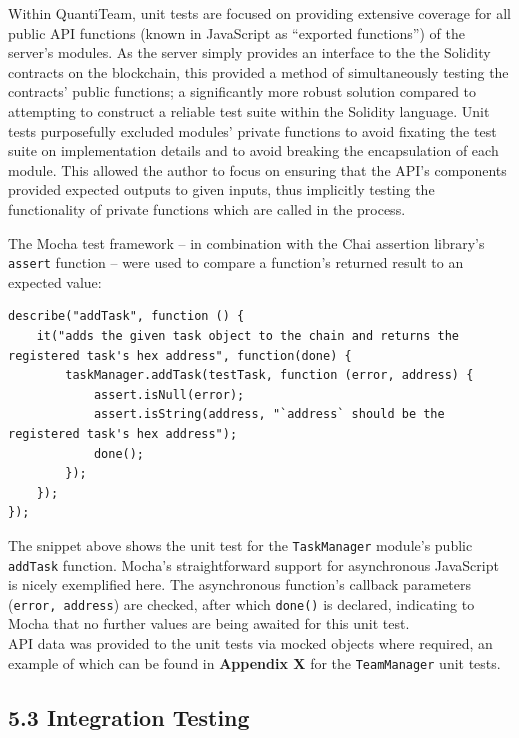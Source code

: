 \documentclass[12pt]{report}
\begin{document}
Within QuantiTeam, unit tests are focused on providing extensive
coverage for all public API functions (known in JavaScript as ``exported
functions'') of the server's modules. As the server simply provides an
interface to the the Solidity contracts on the blockchain, this provided
a method of simultaneously testing the contracts' public functions; a
significantly more robust solution compared to attempting to construct a
reliable test suite within the Solidity language. Unit tests
purposefully excluded modules' private functions to avoid fixating the
test suite on implementation details and to avoid breaking the
encapsulation of each
module\cite{hunt2003pragmatic}. This allowed the author to focus on ensuring that the API's
components provided expected outputs to given inputs, thus implicitly
testing the functionality of private functions which are called in the
process.

The Mocha test framework -- in combination with the Chai assertion
library's \texttt{assert} function -- were used to compare a function's
returned result to an expected value:

\begin{verbatim}
describe("addTask", function () {
    it("adds the given task object to the chain and returns the registered task's hex address", function(done) {
        taskManager.addTask(testTask, function (error, address) {
            assert.isNull(error);
            assert.isString(address, "`address` should be the registered task's hex address");
            done();
        });
    });
});
\end{verbatim}

The snippet above shows the unit test for the \texttt{TaskManager}
module's public \texttt{addTask} function. Mocha's straightforward
support for asynchronous JavaScript is nicely exemplified here. The
asynchronous function's callback parameters (\texttt{error,\ address})
are checked, after which \texttt{done()} is declared, indicating to
Mocha that no further values are being awaited for this unit test.\\
API data was provided to the unit tests via mocked objects where
required, an example of which can be found in \textbf{Appendix X} for
the \texttt{TeamManager} unit tests.

\subsection{5.3 Integration Testing}\label{integration-testing}
\end{document}
